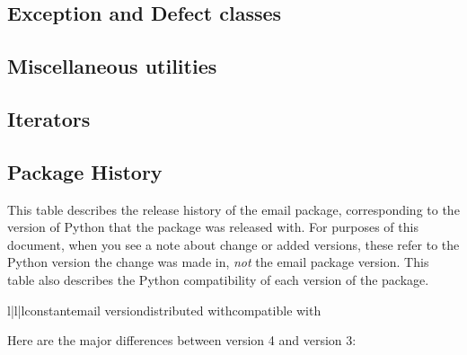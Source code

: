 \subsection{Exception and Defect classes}


\subsection{Miscellaneous utilities}


\subsection{Iterators}


\subsection{Package History\label{email-pkg-history}}

This table describes the release history of the email package, corresponding
to the version of Python that the package was released with.  For purposes of
this document, when you see a note about change or added versions, these refer
to the Python version the change was made in, \emph{not} the email package
version.  This table also describes the Python compatibility of each version
of the package.

\begin{tableiii}{l|l|l}{constant}{email version}{distributed with}{compatible with}
\end{tableiii}

Here are the major differences between  version 4 and version 3:

